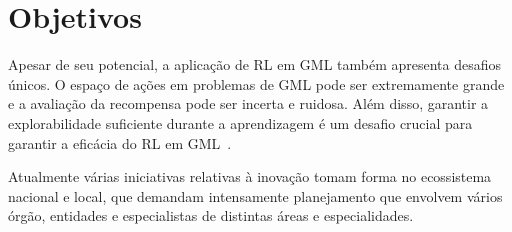 \section{Objetivos}

Apesar de seu potencial, a aplicação de RL em GML também apresenta desafios únicos. O espaço de ações em problemas de GML pode ser extremamente grande e a avaliação da recompensa pode ser incerta e ruidosa. Além disso, garantir a explorabilidade suficiente durante a aprendizagem é um desafio crucial para garantir a eficácia do RL em GML~\cite{Zhang2020}.

Atualmente várias iniciativas relativas à inovação tomam forma no ecossistema nacional e local, que demandam intensamente planejamento que envolvem vários órgão, entidades e especialistas de distintas áreas e especialidades.